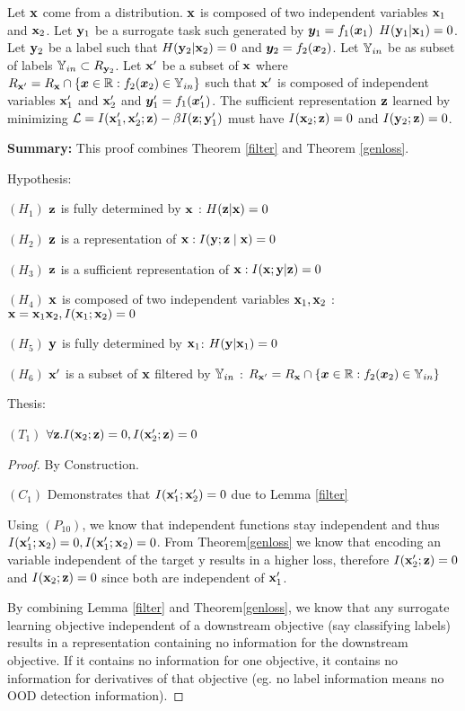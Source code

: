 \begin{corollary}
Let ${\mathbf{x}}$ come from a distribution. ${\mathbf{x}}$ is composed of two independent variables ${\mathbf{x}}_1$ and ${\mathbf{x}}_2$. Let ${\mathbf{y}}_1$ be a surrogate task such generated by ${\bm{y}}_1 = f_1({\bm{x}}_1)$ $H({\mathbf{y}}_1|{\mathbf{x}}_1) = 0$. Let ${\mathbf{y}}_2$ be a label such that $H({\mathbf{y}}_2|{\mathbf{x}}_2) = 0$ and ${\bm{y}}_2 = f_2({\bm{x}}_2)$. Let ${\mathbb{Y}}_{in}$ be as subset of labels ${\mathbb{Y}}_{in} \subset R_{{\mathbf{y}}_2}$. Let ${\mathbf{x}}'$ be a subset of ${\mathbf{x}}$ where $R_{{\mathbf{x}}'} =  R_{{\mathbf{x}}} \cap \{{\bm{x}} \in \mathbb{R}: f_2({\bm{x}}_2) \in {\mathbb{Y}}_{in} \}  $ such that ${\mathbf{x}}'$ is composed of independent variables ${\mathbf{x}}_1'$ and ${\mathbf{x}}_2'$ and ${\bm{y}}_1' = f_1({\bm{x}}_1')$. The sufficient representation ${\mathbf{z}}$ learned by minimizing $\mathcal{L} = I({\mathbf{x}}_1', {\mathbf{x}}_2'; {\mathbf{z}}) - \beta I({\mathbf{z}};{\mathbf{y}}_1')$ must have $I({\mathbf{x}}_2;{\mathbf{z}}) = 0$ and $I({\mathbf{y}}_2;{\mathbf{z}}) = 0$.

\textbf{Summary:} This proof combines Theorem \ref{filter} and Theorem \ref{genloss}.

Hypothesis:

$(H_1)$  ${\mathbf{z}}$ is fully determined by ${\mathbf{x}}$ : $H({\mathbf{z}}|{\mathbf{x}}) = 0$

$(H_2)$  ${\mathbf{z}}$ is a representation of ${\mathbf{x}}: I({\mathbf{y}} ; {\mathbf{z}} \mid {\mathbf{x}})=0$

$(H_3)$  ${\mathbf{z}}$ is a sufficient representation of ${\mathbf{x}}: I({\mathbf{x}} ; {\mathbf{y}} | {\mathbf{z}})=0$

$(H_4)$ ${\mathbf{x}}$ is composed of two independent variables ${\mathbf{x}}_1, {\mathbf{x}}_2$ : ${\mathbf{x}} = {\mathbf{x}}_1 {\mathbf{x}}_2, I({\mathbf{x}}_1 ; {\mathbf{x}}_2) = 0$

$(H_5)$ ${\mathbf{y}}$ is fully determined by ${\mathbf{x}}_1$: $H({\mathbf{y}}|{\mathbf{x}}_1) = 0$

$(H_6)$ ${\mathbf{x}}'$ is a subset of ${\mathbf{x}}$ filtered by ${\mathbb{Y}}_{in}$ : $R_{{\mathbf{x}}'} =  R_{{\mathbf{x}}} \cap \{{\bm{x}} \in \mathbb{R}: f_2({\bm{x}}_2) \in {\mathbb{Y}}_{in} \} $

Thesis:

$(T_1)$ $\forall {\mathbf{z}}.I({\mathbf{x}}_2 ; {\mathbf{z}}) = 0, I({\mathbf{x}}_2' ; {\mathbf{z}}) = 0$

\begin{proof} By Construction.

$(C_1)$ Demonstrates that $I({\mathbf{x}}_1'; {\mathbf{x}}_2') = 0$ due to Lemma \ref{filter}

Using $(P_{10})$, we know that independent functions stay independent and thus $I({\mathbf{x}}_1'; {\mathbf{x}}_2) = 0, I({\mathbf{x}}_1'; {\mathbf{x}}_2) = 0$. From Theorem\ref{genloss} we know that encoding an variable independent of the target y results in a higher loss, therefore $I({\mathbf{x}}_2'; {\mathbf{z}}) = 0$ and $I({\mathbf{x}}_2; {\mathbf{z}}) = 0$ since both are independent of ${\mathbf{x}}_1'$.

By combining Lemma \ref{filter} and Theorem\ref{genloss}, we know that any surrogate learning objective independent of a downstream objective (say classifying labels) results in a representation containing no information for the downstream objective. If it contains no information for one objective, it contains no information for derivatives of that objective (eg. no label information means no OOD detection information).

\end{proof}

\label{failood}
\end{corollary}

